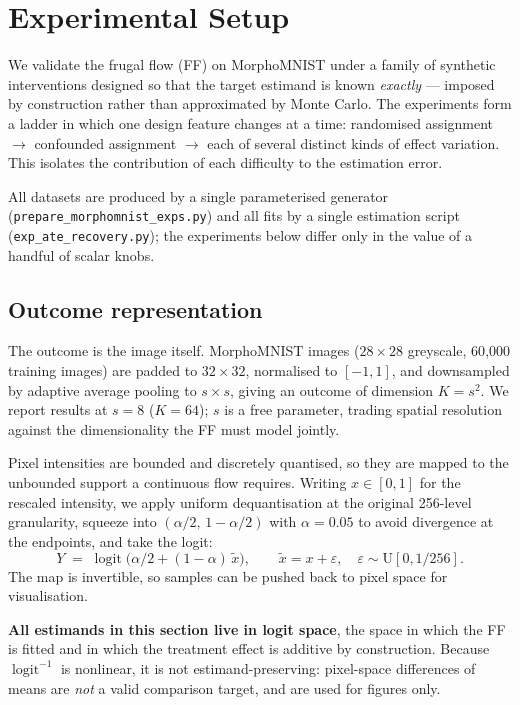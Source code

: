 \section{Experimental Setup}

We validate the frugal flow (FF) on MorphoMNIST under a family of synthetic interventions
designed so that the target estimand is known \emph{exactly} --- imposed by construction rather
than approximated by Monte Carlo. The experiments form a ladder in which one design feature
changes at a time: randomised assignment $\to$ confounded assignment $\to$ each of several
distinct kinds of effect variation. This isolates the contribution of each difficulty to the
estimation error.

All datasets are produced by a single parameterised generator
(\texttt{prepare\_morphomnist\_exps.py}) and all fits by a single estimation script
(\texttt{exp\_ate\_recovery.py}); the experiments below differ only in the value of a handful
of scalar knobs.

\subsection{Outcome representation}

The outcome is the image itself. MorphoMNIST images ($28 \times 28$ greyscale, 60{,}000
training images) are padded to $32 \times 32$, normalised to $[-1, 1]$, and downsampled by
adaptive average pooling to $s \times s$, giving an outcome of dimension $K = s^2$. We report
results at $s = 8$ ($K = 64$); $s$ is a free parameter, trading spatial resolution against the
dimensionality the FF must model jointly.

Pixel intensities are bounded and discretely quantised, so they are mapped to the unbounded
support a continuous flow requires. Writing $x \in [0,1]$ for the rescaled intensity, we apply
uniform dequantisation at the original 256-level granularity, squeeze into
$(\alpha/2,\, 1 - \alpha/2)$ with $\alpha = 0.05$ to avoid divergence at the endpoints, and
take the logit:
\begin{equation}
    Y \;=\; \operatorname{logit}\!\big(\alpha/2 + (1-\alpha)\,\tilde{x}\big),
    \qquad
    \tilde{x} = x + \varepsilon, \quad \varepsilon \sim \mathrm{U}[0, 1/256].
    \label{eq:logit-transform}
\end{equation}
The map is invertible, so samples can be pushed back to pixel space for visualisation.

\textbf{All estimands in this section live in logit space}, the space in which the FF is
fitted and in which the treatment effect is additive by construction. Because
$\operatorname{logit}^{-1}$ is nonlinear, it is not estimand-preserving: pixel-space
differences of means are \emph{not} a valid comparison target, and are used for figures only.

